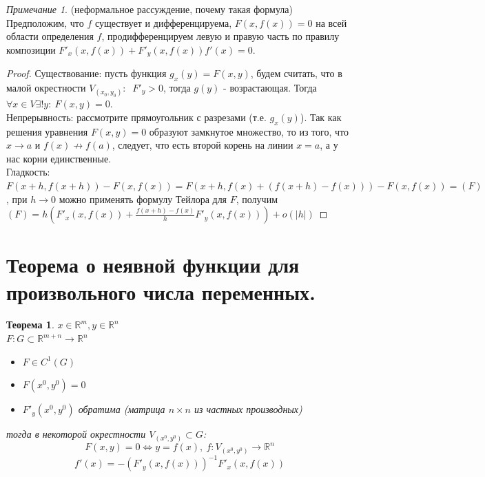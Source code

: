 \documentclass{article}
\theoremstyle{indented}
\newtheorem{theorem}{Теорема}
\theoremstyle{definition}
\theoremstyle{remark}
\newtheorem{remark}{Примечание}
\begin{document}
\begin{remark}
    (неформальное рассуждение, почему такая формула) Предположим, что $f$ существует и дифференцируема,
    $F(x,f(x))=0$ на всей области определения $f$, продифференцируем левую и правую часть по правилу композиции
    $F'_x(x,f(x))+F'_y(x,f(x)) f'(x)=0$.
\end{remark}

\begin{proof}
    Существование: пусть функция $g_x(y) = F(x,y)$, будем считать, что в малой окрестности $V_{(x_0,y_0)}: \ $ 
    $F'_y > 0$, тогда $g(y)$ - возрастающая. Тогда $\forall x \in V \exists ! y: \ F(x,y)=0$. \\
    Непрерывность: рассмотрите прямоугольник с разрезами (т.е. $g_x(y)$). Так как решения уравнения $F(x,y)=0$ образуют
    замкнутое множество, то из того, что $x \to a$ и $f(x) \not\to f(a)$, следует, что есть второй корень на линии $x=a$, а у 
    нас корни единственные. \\
    Гладкость: $F(x+h,f(x+h))-F(x,f(x))=F(x+h,f(x)+(f(x+h)-f(x)))-F(x,f(x))=(F)$, при $h\to 0$ можно применять формулу Тейлора 
    для $F$, получим $(F)=h(F'_x(x,f(x))+\frac{f(x+h)-f(x)}{h}F'_y(x,f(x)))+o(|h|)$
\end{proof}

\section{Теорема о неявной функции для произвольного числа переменных.}

\begin{theorem}
    $x\in \mathbb{R}^m , y \in \mathbb{R}^n$\\
    $F: G\subset\mathbb{R}^{m+n}\to \mathbb{R}^n$
    \begin{itemize}
        \item $F\in C^1(G)$
        \item $F(x^0,y^0)=0$
        \item $F'_y(x^0,y^0)$ обратима (матрица $n\times n$ из частных производных)
    \end{itemize}
    тогда в некоторой окрестности $V_{(x^0,y^0)} \subset G$: 
    $$F(x,y) = 0 \Leftrightarrow y=f(x), \ f: V_{(x^0,y^0)} \to \mathbb{R}^n$$
    $$f'(x) = -(F'_y(x,f(x)))^{-1} F'_x(x,f(x))$$
\end{theorem}
\end{document}
